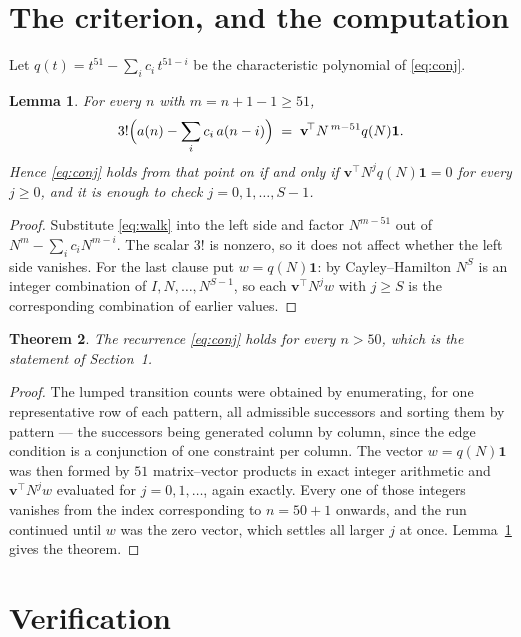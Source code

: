 \documentclass[11pt,a4paper]{article}
\theoremstyle{plain}
\newtheorem{theorem}{Theorem}
\newtheorem{lemma}[theorem]{Lemma}
\theoremstyle{definition}
\begin{document}
\section{The criterion, and the computation}

Let $q(t)=t^{51}-\sum_i c_i\,t^{51-i}$ be the characteristic polynomial of
\eqref{eq:conj}.

\begin{lemma}\label{lem:crit}
For every $n$ with $m=n+1-1\ge51$,
\[
3!\Bigl(a(n)-\sum_i c_i\,a(n-i)\Bigr)\;=\;\mathbf{v}^{\!\top}N^{\,m-51}q(N)\mathbf{1} .
\]
Hence \eqref{eq:conj} holds from that point on if and only if
$\mathbf{v}^{\!\top}N^{j}q(N)\mathbf{1}=0$ for every $j\ge0$, and it is enough to check
$j=0,1,\dots,S-1$.
\end{lemma}

\begin{proof}
Substitute \eqref{eq:walk} into the left side and factor $N^{m-51}$ out of
$N^{m}-\sum_i c_iN^{m-i}$. The scalar $3!$ is nonzero, so it does not affect whether
the left side vanishes. For the last clause put $w=q(N)\mathbf{1}$: by Cayley--Hamilton
$N^{S}$ is an integer combination of $I,N,\dots,N^{S-1}$, so each
$\mathbf{v}^{\!\top}N^{j}w$ with $j\ge S$ is the corresponding combination of earlier
values.
\end{proof}

\begin{theorem}
The recurrence \eqref{eq:conj} holds for every $n>50$, which is the statement of
Section~1.
\end{theorem}

\begin{proof}
The lumped transition counts were obtained by enumerating, for one representative row of
each pattern, all admissible successors and sorting them by pattern --- the successors being
generated column by column, since the edge condition is a conjunction of one constraint per
column. The vector $w=q(N)\mathbf{1}$ was then formed by $51$ matrix--vector products
in exact integer arithmetic and $\mathbf{v}^{\!\top}N^{j}w$ evaluated for
$j=0,1,\dots$, again exactly. Every one of those integers vanishes from the index
corresponding to $n=50+1$ onwards, and the run continued until $w$ was the zero vector,
which settles all larger $j$ at once. Lemma~\ref{lem:crit} gives the theorem.
\end{proof}

\section{Verification}
\end{document}
